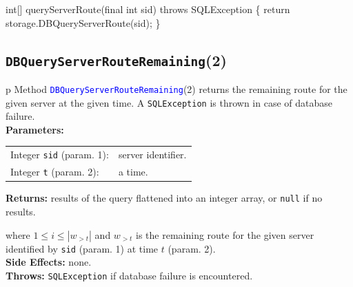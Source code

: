 \nwenddocs{}\endmoddef{}
int[] queryServerRoute(final int sid) throws SQLException \{
  return storage.DBQueryServerRoute(sid);
\}
\eatline
{}\nwendcode{}\nwdocspar
\subsection{\texttt{DBQueryServerRouteRemaining}(2)}
\begin{tabular}{p{\textwidth}}
\toprule
{}
Method \textcolor{blue}{{\tt{}\protect{}DBQueryServerRouteRemaining}}(2) returns the
remaining route for the given server at the given time.
A {\tt{}SQLException} is thrown in case of database failure.\\
\midrule
\textbf{Parameters:} \\
\begin{tabular}{lp{116mm}}
Integer {\tt{}sid} (param. 1):&server identifier.\\
Integer {\tt{}t} (param. 2):&a time.\\
\end{tabular}
\textbf{Returns:} results of the query flattened into an integer array,
or {\tt{}null} if no results.


where $1\leq i\leq |w_{>t}|$ and $w_{>t}$ is the remaining route for the
given server identified by {\tt{}sid} (param. 1) at time $t$ (param. 2).\\
\textbf{Side Effects:} none.\\
\textbf{Throws:} {\tt{}SQLException} if database failure is encountered.\\
\bottomrule
\end{tabular}

